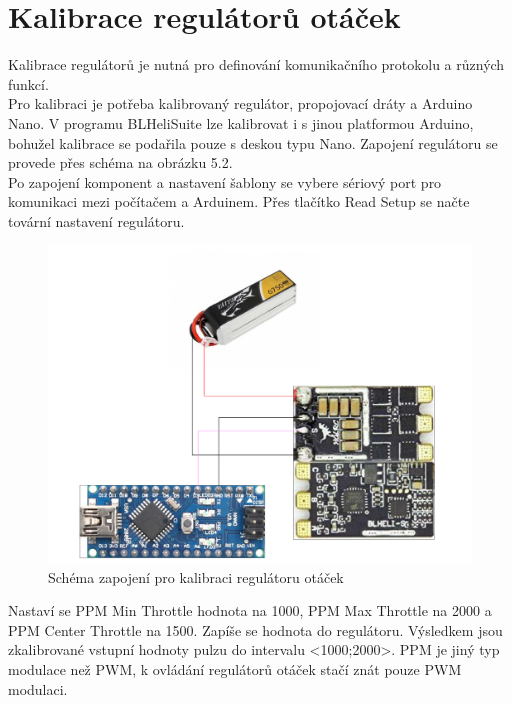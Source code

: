 \section{Kalibrace regulátorů otáček}
Kalibrace regulátorů je nutná pro definování komunikačního protokolu a různých funkcí.\\
Pro kalibraci je potřeba kalibrovaný regulátor, propojovací dráty a Arduino Nano. V programu BLHeliSuite lze kalibrovat i s jinou platformou Arduino, bohužel kalibrace se podařila pouze s deskou typu Nano. Zapojení regulátoru se provede přes schéma na obrázku 5.2.\\
Po zapojení komponent a nastavení šablony se vybere sériový port pro komunikaci mezi počítačem a Arduinem. Přes tlačítko Read Setup se načte tovární nastavení regulátoru.\cite{blheli}\\
\begin{figure}[H]
	\centering
	\includegraphics[width=12cm]{pictures/esc_calib.pdf}
	\caption{Schéma zapojení pro kalibraci regulátoru otáček}
\end{figure}
Nastaví se PPM Min Throttle hodnota na 1000, PPM Max Throttle na 2000 a PPM Center Throttle na 1500. Zapíše se hodnota do regulátoru. Výsledkem jsou zkalibrované vstupní hodnoty pulzu do intervalu <1000;2000>. PPM je jiný typ modulace než PWM, k ovládání regulátorů otáček stačí znát pouze PWM modulaci.\\

